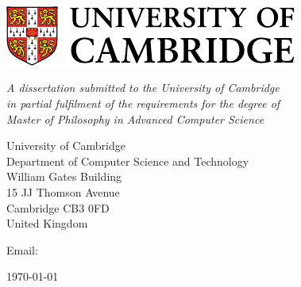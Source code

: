 \begin{titlepage}

\begin{center}
\noindent
\huge
\dissertationtitle \\
\end{center}

\begin{center}
\noindent
\huge
\authorname \\
\Large
\authorcollege      \\[24pt]
\includegraphics{CUni3.pdf}
\end{center}

\vspace{24pt}

\begin{center}
\noindent
\large
{\it A dissertation submitted to the University of Cambridge \\
in partial fulfilment of the requirements for the degree of \\
Master of Philosophy in Advanced Computer Science}
\end{center}

\begin{center}
\noindent
University of Cambridge \\
Department of Computer
Science and Technology  \\
William Gates Building  \\
15 JJ Thomson Avenue    \\
Cambridge CB3 0FD       \\
{\sc United Kingdom}    \\
\end{center}

\begin{center}
\noindent
Email: \authoremail \\
\end{center}

\begin{center}
\noindent
\today
\end{center}

\end{titlepage}

\newpage
\vspace*{\fill}
